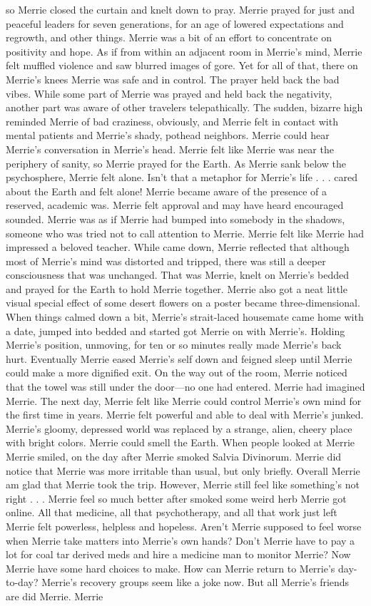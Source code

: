 \documentclass[12pt]{book}
\begin{document}
so Merrie closed the curtain and knelt down to pray. Merrie prayed for just and peaceful leaders for seven generations, for an age of lowered expectations and regrowth, and other things. Merrie was a bit of an effort to concentrate on positivity and hope. As if from within an adjacent room in Merrie's mind, Merrie felt muffled violence and saw blurred images of gore. Yet for all of that, there on Merrie's knees Merrie was safe and in control. The prayer held back the bad vibes. While some part of Merrie was prayed and held back the negativity, another part was aware of other travelers telepathically. The sudden, bizarre high reminded Merrie of bad craziness, obviously, and Merrie felt in contact with mental patients and Merrie's shady, pothead neighbors. Merrie could hear Merrie's conversation in Merrie's head. Merrie felt like Merrie was near the periphery of sanity, so Merrie prayed for the Earth. As Merrie sank below the psychosphere, Merrie felt alone. Isn't that a metaphor for Merrie's life . . .  cared about the Earth and felt alone! Merrie became aware of the presence of a reserved, academic was. Merrie felt approval and may have heard encouraged sounded. Merrie was as if Merrie had bumped into somebody in the shadows, someone who was tried not to call attention to Merrie. Merrie felt like Merrie had impressed a beloved teacher. While came down, Merrie reflected that although most of Merrie's mind was distorted and tripped, there was still a deeper consciousness that was unchanged. That was Merrie, knelt on Merrie's bedded and prayed for the Earth to hold Merrie together. Merrie also got a neat little visual special effect of some desert flowers on a poster became three-dimensional. When things calmed down a bit, Merrie's strait-laced housemate came home with a date, jumped into bedded and started got Merrie on with Merrie's. Holding Merrie's position, unmoving, for ten or so minutes really made Merrie's back hurt. Eventually Merrie eased Merrie's self down and feigned sleep until Merrie could make a more dignified exit. On the way out of the room, Merrie noticed that the towel was still under the door---no one had entered. Merrie had imagined Merrie. The next day, Merrie felt like Merrie could control Merrie's own mind for the first time in years. Merrie felt powerful and able to deal with Merrie's junked. Merrie's gloomy, depressed world was replaced by a strange, alien, cheery place with bright colors. Merrie could smell the Earth. When people looked at Merrie Merrie smiled, on the day after Merrie smoked Salvia Divinorum. Merrie did notice that Merrie was more irritable than usual, but only briefly. Overall Merrie am glad that Merrie took the trip. However, Merrie still feel like something's not right . . .  Merrie feel so much better after smoked some weird herb Merrie got online. All that medicine, all that psychotherapy, and all that work just left Merrie felt powerless, helpless and hopeless. Aren't Merrie supposed to feel worse when Merrie take matters into Merrie's own hands? Don't Merrie have to pay a lot for coal tar derived meds and hire a medicine man to monitor Merrie? Now Merrie have some hard choices to make. How can Merrie return to Merrie's day-to-day? Merrie's recovery groups seem like a joke now. But all Merrie's friends are did Merrie. Merrie 
\end{document}
